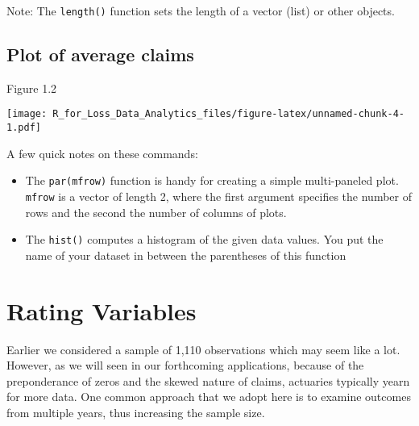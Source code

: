 \documentclass[]{book}
\newenvironment{Shaded}{\begin{snugshade}}{\end{snugshade}}
\newcommand{\KeywordTok}[1]{\textcolor[rgb]{0.13,0.29,0.53}{\textbf{#1}}}
\newcommand{\DataTypeTok}[1]{\textcolor[rgb]{0.13,0.29,0.53}{#1}}
\newcommand{\DecValTok}[1]{\textcolor[rgb]{0.00,0.00,0.81}{#1}}
\newcommand{\StringTok}[1]{\textcolor[rgb]{0.31,0.60,0.02}{#1}}
\newcommand{\OperatorTok}[1]{\textcolor[rgb]{0.81,0.36,0.00}{\textbf{#1}}}
\newcommand{\NormalTok}[1]{#1}
\theoremstyle{definition}
\theoremstyle{definition}
\theoremstyle{definition}
\theoremstyle{remark}
\begin{document}
Note: The \texttt{length()} function sets the length of a vector (list)
or other objects.

\subsection{Plot of average claims}\label{plot-of-average-claims}

Figure 1.2

\begin{Shaded}
\end{Shaded}

\texttt{[image: R\_for\_Loss\_Data\_Analytics\_files/figure-latex/unnamed-chunk-4-1.pdf]}

A few quick notes on these commands:

\begin{itemize}
\item
  The \texttt{par(mfrow)} function is handy for creating a simple
  multi-paneled plot. \texttt{mfrow} is a vector of length 2, where the
  first argument specifies the number of rows and the second the number
  of columns of plots.
\item
  The \texttt{hist()} computes a histogram of the given data values. You
  put the name of your dataset in between the parentheses of this
  function
\end{itemize}

\section{Rating Variables}\label{rating-variables}

Earlier we considered a sample of 1,110 observations which may seem like
a lot. However, as we will seen in our forthcoming applications, because
of the preponderance of zeros and the skewed nature of claims, actuaries
typically yearn for more data. One common approach that we adopt here is
to examine outcomes from multiple years, thus increasing the sample
size.
\end{document}
